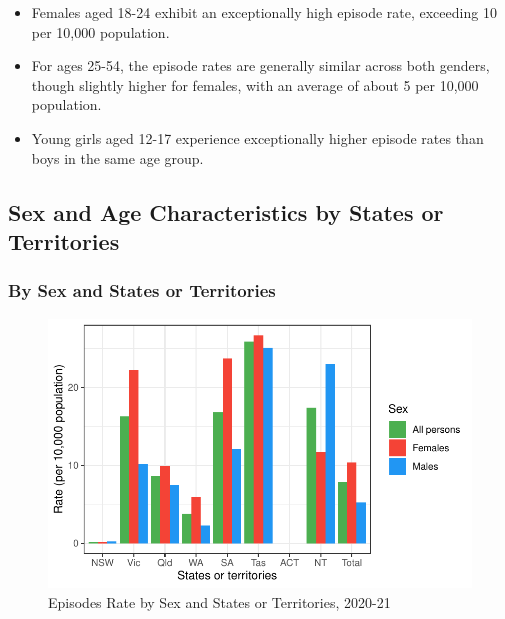 \documentclass[
  a4paper,
  DIV=11,
  numbers=noendperiod]{scrreport}
\begin{document}
\begin{itemize}
\item
  Females aged 18-24 exhibit an exceptionally high episode rate,
  exceeding 10 per 10,000 population.
\item
  For ages 25-54, the episode rates are generally similar across both
  genders, though slightly higher for females, with an average of about
  5 per 10,000 population.
\item
  Young girls aged 12-17 experience exceptionally higher episode rates
  than boys in the same age group.
\end{itemize}

\hypertarget{sex-and-age-characteristics-by-states-or-territories}{%
\subsection{Sex and Age Characteristics by States or
Territories}\label{sex-and-age-characteristics-by-states-or-territories}}

\hypertarget{by-sex-and-states-or-territories-1}{%
\subsubsection{By Sex and States or
Territories}\label{by-sex-and-states-or-territories-1}}

\begin{figure}

\caption{\label{fig-rmhc-gss}Episodes Rate by Sex and States or
Territories, 2020-21}

{\centering \includegraphics{./chap4-rmhc_files/figure-pdf/fig-rmhc-gss-1.pdf}

}

\end{figure}
\end{document}
